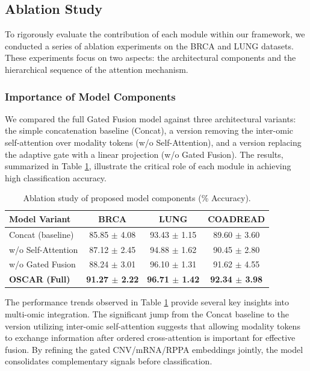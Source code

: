 \documentclass[lettersize,journal]{IEEEtran}
\begin{document}
\subsection{Ablation Study}


To rigorously evaluate the contribution of each module within our framework, we conducted a series of ablation experiments on the BRCA and LUNG datasets. These experiments focus on two aspects: the architectural components and the hierarchical sequence of the attention mechanism.

\subsubsection{Importance of Model Components}
We compared the full Gated Fusion model against three architectural variants: the simple concatenation baseline (Concat), a version removing the inter-omic self-attention over modality tokens (w/o Self-Attention), and a version replacing the adaptive gate with a linear projection (w/o Gated Fusion). The results, summarized in Table \ref{tab:ablation_components}, illustrate the critical role of each module in achieving high classification accuracy.


\begin{table}[!htbp]
\centering
\small
\caption{Ablation study of proposed model components (\% Accuracy).}
\label{tab:ablation_components}
\begin{tabular}{lccc}
\hline
\textbf{Model Variant} & \textbf{BRCA} & \textbf{LUNG} & \textbf{COADREAD} \\ \hline
Concat (baseline)      & 85.85 $\pm$ 4.08 & 93.43 $\pm$ 1.15 & 89.60 $\pm$ 3.60 \\
w/o Self-Attention     & 87.12 $\pm$ 2.45 & 94.88 $\pm$ 1.62 & 90.45 $\pm$ 2.80 \\
w/o Gated Fusion       & 88.24 $\pm$ 3.01 & 96.10 $\pm$ 1.31 & 91.62 $\pm$ 4.55 \\ \hline
\textbf{OSCAR (Full)} & \textbf{91.27 $\pm$ 2.22} & \textbf{96.71 $\pm$ 1.42} & \textbf{92.34 $\pm$ 3.98} \\ \hline
\end{tabular}
\end{table}

The performance trends observed in Table \ref{tab:ablation_components} provide several key insights into multi-omic integration. The significant jump from the Concat baseline to the version utilizing inter-omic self-attention suggests that allowing modality tokens to exchange information after ordered cross-attention is important for effective fusion. By refining the gated CNV/mRNA/RPPA embeddings jointly, the model consolidates complementary signals before classification. 
\end{document}
